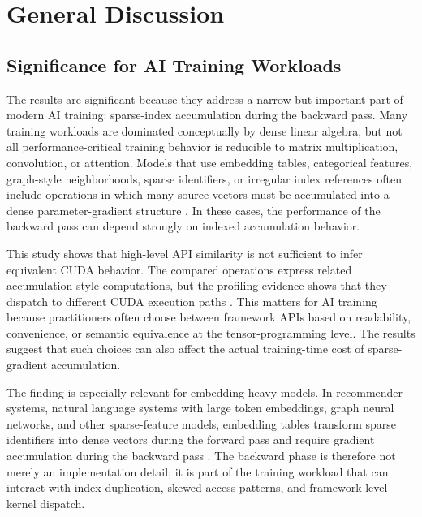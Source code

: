 \section{General Discussion}
\label{sec:general-discussion}

\subsection{Significance for AI Training Workloads}

The results are significant because they address a narrow but important part of modern AI training: sparse-index accumulation during the backward pass. Many training workloads are dominated conceptually by dense linear algebra, but not all performance-critical training behavior is reducible to matrix multiplication, convolution, or attention. Models that use embedding tables, categorical features, graph-style neighborhoods, sparse identifiers, or irregular index references often include operations in which many source vectors must be accumulated into a dense parameter-gradient structure \cite{gupta2020architectural,pytorchStableEmbedding}. In these cases, the performance of the backward pass can depend strongly on indexed accumulation behavior.

This study shows that high-level API similarity is not sufficient to infer equivalent CUDA behavior. The compared operations express related accumulation-style computations, but the profiling evidence shows that they dispatch to different CUDA execution paths \cite{pytorchStableIndexAdd,pytorchStableScatterAdd,pytorchStableEmbedding}. This matters for AI training because practitioners often choose between framework APIs based on readability, convenience, or semantic equivalence at the tensor-programming level. The results suggest that such choices can also affect the actual training-time cost of sparse-gradient accumulation.

The finding is especially relevant for embedding-heavy models. In recommender systems, natural language systems with large token embeddings, graph neural networks, and other sparse-feature models, embedding tables transform sparse identifiers into dense vectors during the forward pass and require gradient accumulation during the backward pass \cite{acun2021training,nvidia_recsys_best_practices,pytorchStableEmbedding}. The backward phase is therefore not merely an implementation detail; it is part of the training workload that can interact with index duplication, skewed access patterns, and framework-level kernel dispatch.

